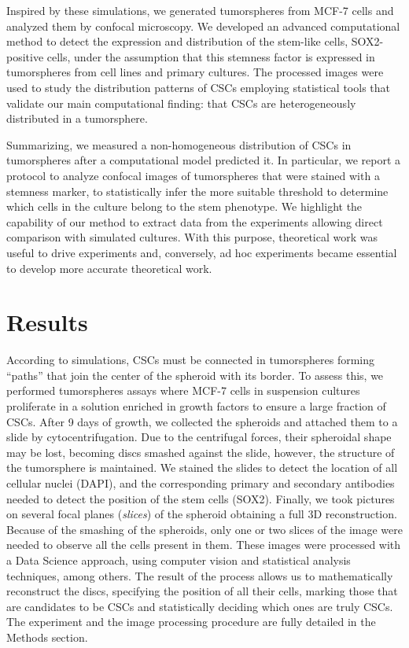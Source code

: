 \documentclass[fleqn,10pt]{wlscirep}
\begin{document}
Inspired by these simulations, we generated tumorspheres from MCF-7 cells and analyzed them by confocal microscopy.  We developed an advanced computational method to detect the expression and distribution of the stem-like cells, SOX2-positive cells, under the assumption\cite{Leis} that this stemness factor is expressed in tumorspheres from cell lines and primary cultures. The processed images were used to study the distribution patterns of CSCs employing statistical tools that validate our main computational finding: that CSCs are heterogeneously distributed in a tumorsphere. 

Summarizing, we measured a non-homogeneous distribution of CSCs in tumorspheres after a computational model predicted it. In particular, we report a protocol to analyze confocal images of tumorspheres that were stained with a stemness marker, to statistically infer the more suitable threshold to determine which cells in the culture belong to the stem phenotype. We highlight the capability of our method to extract data from the experiments allowing direct comparison with simulated cultures. With this purpose, theoretical work was useful to drive experiments and, conversely, ad hoc experiments became essential to develop more accurate theoretical work.      


\section*{Results} \label{s: results}
According to simulations\cite{barberis2021percolation}, CSCs must be connected in tumorspheres forming ``paths'' that join the center of the spheroid with its border. To assess this, we performed tumorspheres assays where MCF-7 cells in suspension cultures proliferate in a solution enriched in growth factors to ensure a large fraction of CSCs. After 9 days of growth, we collected the spheroids and attached them to a slide by cytocentrifugation. Due to the centrifugal forces, their spheroidal shape may be lost, becoming discs smashed against the slide, however, the structure of the tumorsphere is maintained. We stained the slides to detect the location of all cellular nuclei (DAPI), and the corresponding primary and secondary antibodies needed to detect the position of the stem cells (SOX2). Finally, we took pictures on several focal planes (\emph{slices}) of the spheroid obtaining a full 3D reconstruction. Because of the smashing of the spheroids, only one or two slices of the image were needed to observe all the cells present in them. These images were processed with a Data Science approach, using computer vision and statistical analysis techniques, among others. The result of the process allows us to mathematically reconstruct the discs, specifying the position of all their cells, marking those that are candidates to be CSCs and statistically deciding which ones are truly CSCs.
The experiment and the image processing procedure are fully detailed in the Methods section.
\end{document}
